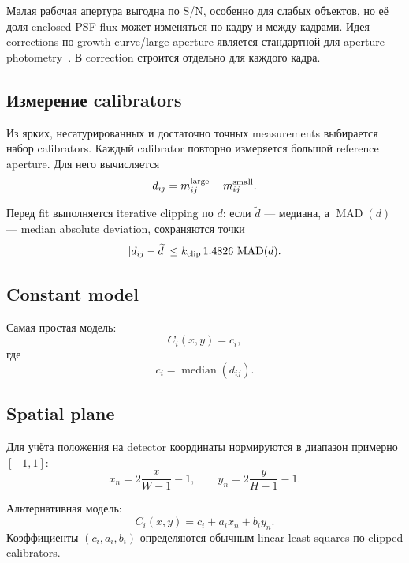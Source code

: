 Малая рабочая апертура выгодна по S/N, особенно для слабых объектов, но её доля enclosed PSF flux может изменяться по кадру и между кадрами. Идея corrections по growth curve/large aperture является стандартной для aperture photometry~\cite{howell1989}. В \program{} correction строится отдельно для каждого кадра.

\subsection{Измерение calibrators}

Из ярких, несатурированных и достаточно точных measurements выбирается набор calibrators. Каждый calibrator повторно измеряется большой reference aperture. Для него вычисляется
\begin{equation}
  d_{ij}=m^{\rm large}_{ij}-m^{\rm small}_{ij}.
  \label{eq:aperture-delta}
\end{equation}

Перед fit выполняется iterative clipping по $d$: если $\widetilde d$ --- медиана, а $\operatorname{MAD}(d)$ --- median absolute deviation, сохраняются точки
\begin{equation}
  |d_{ij}-\widetilde d|
  \le k_{\rm clip}\,1.4826\,\operatorname{MAD}(d).
\end{equation}

\subsection{Constant model}

Самая простая модель:
\begin{equation}
  C_i(x,y)=c_i,
\end{equation}
где
\begin{equation}
  c_i=\operatorname{median}(d_{ij}).
\end{equation}

\subsection{Spatial plane}

Для учёта положения на detector координаты нормируются в диапазон примерно $[-1,1]$:
\begin{equation}
  x_n=2\frac{x}{W-1}-1,
  \qquad
  y_n=2\frac{y}{H-1}-1.
\end{equation}

Альтернативная модель:
\begin{equation}
  C_i(x,y)=c_i+a_i x_n+b_i y_n.
  \label{eq:aperture-plane}
\end{equation}
Коэффициенты $(c_i,a_i,b_i)$ определяются обычным linear least squares по clipped calibrators.


